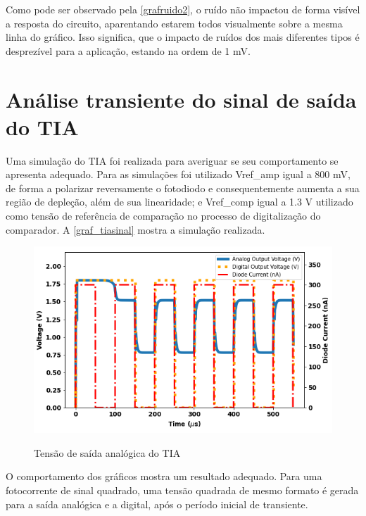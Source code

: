 Como pode ser observado pela \autoref{grafruido2}, o ruído não impactou de forma visível a resposta do circuito, aparentando estarem todos visualmente sobre a mesma linha do gráfico. Isso significa, que o impacto de ruídos dos mais diferentes tipos é desprezível para a aplicação, estando na ordem de 1 mV.

\section{Análise transiente do sinal de saída do TIA}

Uma simulação do TIA foi realizada para averiguar se seu comportamento se apresenta adequado. Para as simulações foi utilizado Vref\_amp igual a 800 mV, de forma a polarizar reversamente o fotodiodo e consequentemente aumenta a sua região de depleção, além de sua linearidade; e Vref\_comp igual a 1.3 V utilizado como tensão de referência de comparação no processo de digitalização do comparador. A \autoref{graf_tiasinal} mostra a simulação realizada.

\begin{figure}[!h]
 \centering
    \caption{Tensão de saída analógica do TIA} 
    \includegraphics[scale=0.5]{Resultados/Graficos/tb_clock.png}
    \label{graf_tiasinal}
\end{figure}

O comportamento dos gráficos mostra um resultado adequado. Para uma fotocorrente de sinal quadrado, uma tensão quadrada de mesmo formato é gerada para a saída analógica e a digital, após o período inicial de transiente.

